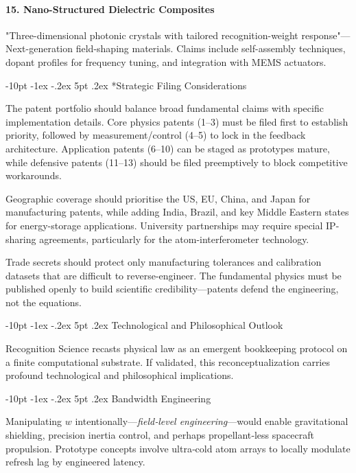 \documentclass[12pt,letterpaper]{book}
\makeatletter
\renewcommand\section{\@startsection {section}{1}{\z@}%
                {-10pt \@plus -1ex \@minus -.2ex}%
                {5pt \@plus.2ex}%
                {\normalfont\large\bfseries}}
\makeatother
\begin{document}
\paragraph{15. Nano-Structured Dielectric Composites}
"Three-dimensional photonic crystals with tailored recognition-weight response"—Next-generation field-shaping materials.  Claims include self-assembly techniques, dopant profiles for frequency tuning, and integration with MEMS actuators.

\section*{Strategic Filing Considerations}

The patent portfolio should balance broad fundamental claims with specific implementation details.  Core physics patents (1–3) must be filed first to establish priority, followed by measurement/control (4–5) to lock in the feedback architecture.  Application patents (6–10) can be staged as prototypes mature, while defensive patents (11–13) should be filed preemptively to block competitive workarounds.

Geographic coverage should prioritise the US, EU, China, and Japan for manufacturing patents, while adding India, Brazil, and key Middle Eastern states for energy-storage applications.  University partnerships may require special IP-sharing agreements, particularly for the atom-interferometer technology.

Trade secrets should protect only manufacturing tolerances and calibration datasets that are difficult to reverse-engineer.  The fundamental physics must be published openly to build scientific credibility—patents defend the engineering, not the equations.

\section{Technological and Philosophical Outlook}

Recognition Science recasts physical law as an emergent bookkeeping protocol on a finite computational substrate.  If validated, this reconceptualization carries profound technological and philosophical implications.

\section{Bandwidth Engineering}

Manipulating $w$ intentionally—\emph{field‐level engineering}—would enable gravitational shielding, precision inertia control, and perhaps propellant‐less spacecraft propulsion.  Prototype concepts involve ultra‐cold atom arrays to locally modulate refresh lag by engineered latency.
\end{document}
